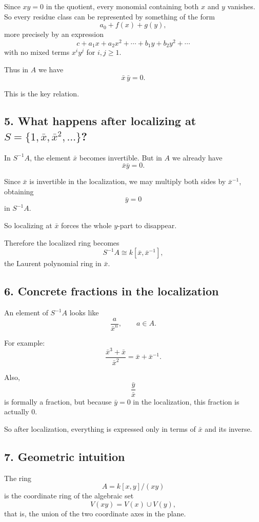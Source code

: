 \documentclass[12pt,a4paper]{article}
\theoremstyle{notespace}
\begin{document}
Since \(xy=0\) in the quotient, every monomial containing both \(x\) and \(y\) vanishes. So every residue class can be represented by something of the form
\[
a_0 + f(x) + g(y),
\]
more precisely by an expression
\[
c + a_1x+a_2x^2+\cdots + b_1y+b_2y^2+\cdots
\]
with no mixed terms \(x^iy^j\) for \(i,j\ge 1\).

Thus in \(A\) we have
\[
\bar x\,\bar y=0.
\]

This is the key relation.

\subsection{5. What happens after localizing at \(S=\{1,\bar x,\bar x^2,\dots\}\)?}

In \(S^{-1}A\), the element \(\bar x\) becomes invertible. But in \(A\) we already have
\[
\bar x\bar y=0.
\]

Since \(\bar x\) is invertible in the localization, we may multiply both sides by \(\bar x^{-1}\), obtaining
\[
\bar y=0
\]
in \(S^{-1}A\).

So localizing at \(\bar x\) forces the whole \(y\)-part to disappear.

Therefore the localized ring becomes
\[
S^{-1}A \cong k[\bar x,\bar x^{-1}],
\]
the Laurent polynomial ring in \(\bar x\).

\subsection{6. Concrete fractions in the localization}

An element of \(S^{-1}A\) looks like
\[
\frac{a}{\bar x^n}, \qquad a\in A.
\]

For example:
\[
\frac{\bar x^3+\bar x}{\bar x^2}
= \bar x + \bar x^{-1}.
\]

Also,
\[
\frac{\bar y}{\bar x}
\]
is formally a fraction, but because \(\bar y=0\) in the localization, this fraction is actually \(0\).

So after localization, everything is expressed only in terms of \(\bar x\) and its inverse.

\subsection{7. Geometric intuition}

The ring
\[
A=k[x,y]/(xy)
\]
is the coordinate ring of the algebraic set
\[
V(xy)=V(x)\cup V(y),
\]
that is, the union of the two coordinate axes in the plane.
\end{document}
